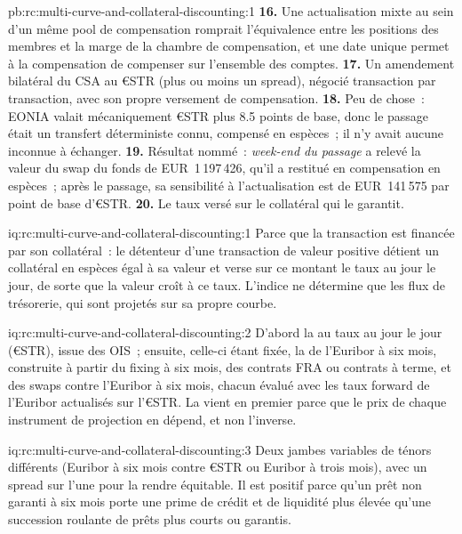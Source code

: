 \begin{solution}{pb:rc:multi-curve-and-collateral-discounting:1}
\textbf{16.} Une actualisation mixte au sein d'un même pool de compensation romprait
l'équivalence entre les positions des membres et la marge de la chambre de compensation, et une
date unique permet à la compensation de compenser sur l'ensemble des comptes.
\textbf{17.} Un amendement bilatéral du CSA au €STR (plus ou moins un spread),
négocié transaction par transaction, avec son propre versement de compensation.
\textbf{18.} Peu de chose~: EONIA valait mécaniquement €STR plus 8.5 points de base, donc le
passage était un transfert déterministe connu, compensé en espèces~; il n'y avait aucune
inconnue à échanger.
\textbf{19.} Résultat nommé~: \emph{week-end du passage} a relevé la valeur du swap du fonds de
EUR~1\,197\,426, qu'il a restitué en compensation en espèces~; après le passage, sa sensibilité à l'actualisation est de
EUR~141\,575 par point de base d'€STR.
\textbf{20.} Le taux versé sur le collatéral qui le garantit.
\end{solution}

\begin{solution}{iq:rc:multi-curve-and-collateral-discounting:1}
Parce que la transaction est financée par son collatéral~: le détenteur d'une transaction de valeur positive
détient un collatéral en espèces égal à sa valeur et verse sur ce montant le taux au jour le jour, de sorte que
la valeur croît à ce taux. L'indice ne détermine que les flux de trésorerie,
qui sont projetés sur sa propre courbe.
\end{solution}

\begin{solution}{iq:rc:multi-curve-and-collateral-discounting:2}
D'abord la  au taux au jour le jour (€STR), issue des OIS~; ensuite, celle-ci étant fixée,
la  de l'Euribor à six mois, construite à partir du fixing à six mois, des
contrats FRA ou contrats à terme, et des swaps contre l'Euribor à six mois, chacun
évalué avec les taux forward de l'Euribor actualisés sur l'€STR. La  vient en premier
parce que le prix de chaque instrument de projection en dépend, et non l'inverse.
\end{solution}

\begin{solution}{iq:rc:multi-curve-and-collateral-discounting:3}
Deux jambes variables de ténors différents (Euribor à six mois contre €STR ou
Euribor à trois mois), avec un spread sur l'une pour la rendre équitable. Il est positif
parce qu'un prêt non garanti à six mois porte une prime de crédit et de liquidité plus élevée
qu'une succession roulante de prêts plus courts ou garantis.
\end{solution}

